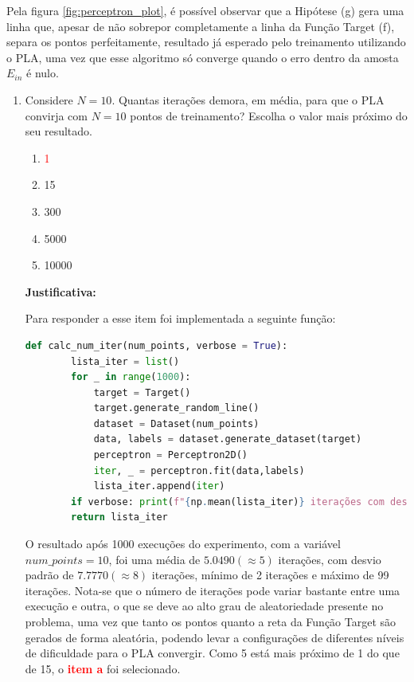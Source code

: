 Pela figura \ref{fig:perceptron_plot}, é possível observar que a Hipótese (g) gera uma linha que, apesar de não sobrepor completamente a linha da Função Target (f), separa os pontos perfeitamente, resultado já esperado pelo treinamento utilizando o PLA, uma vez que esse algoritmo só converge quando o erro dentro da amosta $E_{in}$ é nulo.  

\begin{enumerate}
    \item Considere $N = 10$. Quantas iterações demora, em média, para que o PLA convirja com $N = 10$
    pontos de treinamento? Escolha o valor mais próximo do seu resultado.

    \begin{enumerate}
        \item[\textcolor{red}{(a)}]\textcolor{red}{1}\addtocounter{enumii}{1}
        \item 15
        \item 300
        \item 5000
        \item 10000
    \end{enumerate}
     
    \par

    \textbf{Justificativa:}

    Para responder a esse item foi implementada a seguinte função:

    \begin{lstlisting}[language=Python, caption=Cálculo do número de iterações, label=cod:perceptron_num_iter]
        def calc_num_iter(num_points, verbose = True):
        lista_iter = list()
        for _ in range(1000):
            target = Target()
            target.generate_random_line()
            dataset = Dataset(num_points)
            data, labels = dataset.generate_dataset(target)
            perceptron = Perceptron2D()
            iter, _ = perceptron.fit(data,labels)
            lista_iter.append(iter)
        if verbose: print(f"{np.mean(lista_iter)} iterações com desvio padrão {np.std(lista_iter):.4f} (min:{np.min(lista_iter)}, máx:{np.max(lista_iter)})")
        return lista_iter
    \end{lstlisting}

    O resultado após 1000 execuções do experimento, com a variável $num\_points = 10$, foi uma média de $5.0490(\approx 5)$ iterações, com desvio padrão de $7.7770(\approx 8)$ iterações, mínimo de 2 iterações e máximo de 99 iterações. Nota-se que o número de iterações pode variar bastante entre uma execução e outra, o que se deve ao alto grau de aleatoriedade presente no problema, uma vez que tanto os pontos quanto a reta da Função Target são gerados de forma aleatória, podendo levar a configurações de diferentes níveis de dificuldade para o PLA convergir. 
     Como 5 está mais próximo de 1 do que de 15, o \textcolor{red}{\textbf{item a}} foi selecionado. 
    

\end{enumerate}
